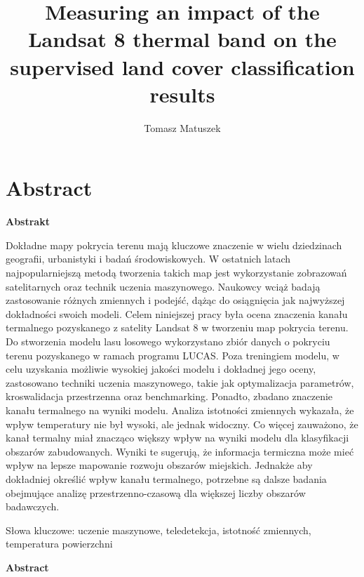 \documentclass{amuthesis}
\author{Tomasz Matuszek}
\title{Measuring an impact of the Landsat 8 thermal band on the
supervised land cover classification results}
\begin{document}

\titlepage


\hypertarget{abstract}{%
\chapter*{Abstract}\label{abstract}}


\textbf{Abstrakt}

Dokładne mapy pokrycia terenu mają kluczowe znaczenie w wielu
dziedzinach geografii, urbanistyki i badań środowiskowych. W ostatnich
latach najpopularniejszą metodą tworzenia takich map jest wykorzystanie
zobrazowań satelitarnych oraz technik uczenia maszynowego. Naukowcy
wciąż badają zastosowanie różnych zmiennych i podejść, dążąc do
osiągnięcia jak najwyższej dokładności swoich modeli. Celem niniejszej
pracy była ocena znaczenia kanału termalnego pozyskanego z satelity
Landsat 8 w tworzeniu map pokrycia terenu. Do stworzenia modelu lasu
losowego wykorzystano zbiór danych o pokryciu terenu pozyskanego w
ramach programu LUCAS. Poza treningiem modelu, w celu uzyskania możliwie
wysokiej jakości modelu i dokładnej jego oceny, zastosowano techniki
uczenia maszynowego, takie jak optymalizacja parametrów, kroswalidacja
przestrzenna oraz benchmarking. Ponadto, zbadano znaczenie kanału
termalnego na wyniki modelu. Analiza istotności zmiennych wykazała, że
wpływ temperatury nie był wysoki, ale jednak widoczny. Co więcej
zauważono, że kanał termalny miał znacząco większy wpływ na wyniki
modelu dla klasyfikacji obszarów zabudowanych. Wyniki te sugerują, że
informacja termiczna może mieć wpływ na lepsze mapowanie rozwoju
obszarów miejskich. Jednakże aby dokładniej określić wpływ kanału
termalnego, potrzebne są dalsze badania obejmujące analizę
przestrzenno-czasową dla większej liczby obszarów badawczych.

Słowa kluczowe: uczenie maszynowe, teledetekcja, istotność zmiennych,
temperatura powierzchni

\newpage

\textbf{Abstract}
\end{document}
